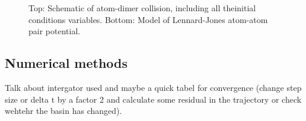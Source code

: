 \documentclass[%
 reprint,
 amsmath,amssymb,
 aps,
10pt
]{revtex4-1}
\begin{document}
\begin{figure}[htp]


\caption{Top: Schematic of atom-dimer collision, including all theinitial conditions variables. Bottom: Model of Lennard-Jones atom-atom pair potential.}
\label{fig:schematic}
\end{figure}


\subsection{\label{sec:level2}Numerical methods}

Talk about intergator used and maybe a quick tabel for convergence (change step size or delta t by a factor 2 and calculate some residual in the trajectory or check wehtehr the basin has changed).
\end{document}
